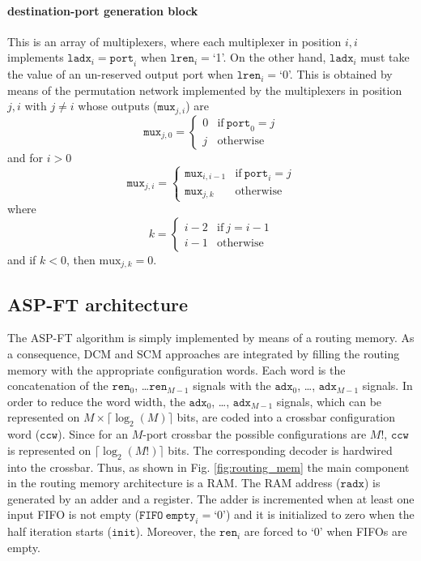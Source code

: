 \documentclass[10pt,twocolumn,journal]{IEEEtran}
\begin{document}
\paragraph{destination-port generation block}
This is an array of multiplexers, where each multiplexer in position $i,i$ implements 
$\mathtt{ladx}_i = \mathtt{port}_i$ when $\mathtt{lren}_i=$`1'. On the other hand, $\mathtt{ladx}_i$ must 
take the value of an un-reserved output port when $\mathtt{lren}_i=$`0'. 
This is obtained by means of the permutation network implemented by 
the multiplexers in position $j,i$ with $j \ne i$ whose outputs ($\mathtt{mux}_{j,i}$) are
\begin{equation}
  \mathtt{mux}_{j,0} = \left\{
  \begin{array}{ll}
    0 & \mathrm{if}~\mathtt{port}_0 = j \\
    j & \mathrm{otherwise}
  \end{array} \right.
\end{equation}
and for $i>0$ 
\begin{equation}
  \mathtt{mux}_{j,i} = \left\{ 
  \begin{array} {ll}
    \mathtt{mux}_{i,i-1} & \mathrm{if}~\mathtt{port}_i = j \\
    \mathtt{mux}_{j,k}   & \mathrm{otherwise}
  \end{array} \right. 
\end{equation}
where
\begin{equation}
k = \left\{
  \begin{array} {ll}
    i-2 & \mathrm{if}~j=i-1 \\
    i-1 & \mathrm{otherwise}
  \end{array} \right.
\end{equation}
and if $k<0$, then $\mathrm{mux}_{j,k}=0$.


\subsection{ASP-FT architecture}
\label{subsec:ASP}
The ASP-FT algorithm is simply implemented by means of a routing memory. As a consequence, 
DCM and SCM 
approaches are integrated by filling the routing memory with the appropriate configuration words.
Each word is the concatenation of the $\mathtt{ren}_0$, \dots $\mathtt{ren}_{M-1}$ signals with the 
$\mathtt{adx}_0$, \dots, $\mathtt{adx}_{M-1}$ signals. In order to reduce the word width, 
the $\mathtt{adx}_0$, \dots, $\mathtt{adx}_{M-1}$ signals, which can be represented 
on $M \times \lceil \log_2 (M) \rceil$ bits,  
are coded into a crossbar configuration word ($\mathtt{ccw}$). 
Since for an $M$-port crossbar the possible configurations are $M!$, $\mathtt{ccw}$ is 
represented on $\lceil \log_2(M!)\rceil$ bits.  
The corresponding decoder is hardwired into the crossbar. Thus, as shown in Fig. \ref{fig:routing_mem} the 
main component in the routing memory architecture is a RAM.
The RAM address ($\mathtt{radx}$) 
is generated by an adder and a register. 
The adder is incremented when at least one input FIFO is not empty ($\mathtt{FIFO~empty}_i=$`0') and it is initialized to 
zero when the half iteration starts ($\mathtt{init}$). Moreover, the $\mathtt{ren}_i$ are forced to `0' when FIFOs are 
empty.
\end{document}
